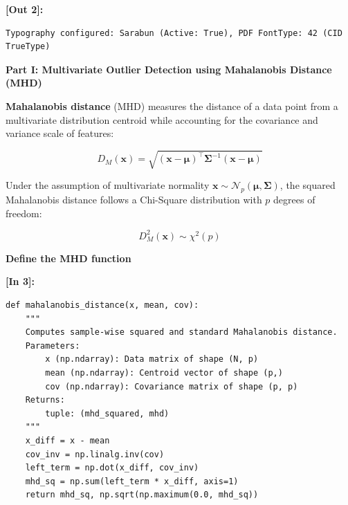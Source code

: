 \vspace{0.2em}
\noindent\textbf{\small [Out 2]:}
\begin{lstlisting}[style=output]
Typography configured: Sarabun (Active: True), PDF FontType: 42 (CID TrueType)
\end{lstlisting}
\vspace{0.8em}
\begin{tcolorbox}[colback=partorange!10!white,colframe=partorange,boxrule=1pt,arc=3pt,left=6pt,right=6pt,top=4pt,bottom=4pt,unbreakable]
{\large\bfseries Part I: Multivariate Outlier Detection using Mahalanobis Distance (MHD)\par}
\end{tcolorbox}
\vspace{0.4em}
\vspace{0.3em}
\begin{tcolorbox}[colback=codebg,colframe=codeframe,boxrule=0.6pt,arc=3pt,left=6pt,right=6pt,top=4pt,bottom=4pt,unbreakable,before upper={\sloppy\raggedright}]
\textbf{Mahalanobis distance} (MHD) measures the distance of a data point from a multivariate distribution centroid while accounting for the covariance and variance scale of features:

\[D_M(\mathbf{x}) = \sqrt{(\mathbf{x} - \boldsymbol{\mu})^\top \mathbf{\Sigma}^{-1} (\mathbf{x} - \boldsymbol{\mu})}\]

Under the assumption of multivariate normality \(\mathbf{x} \sim \mathcal{N}_p(\boldsymbol{\mu}, \mathbf{\Sigma})\), the squared Mahalanobis distance follows a Chi-Square distribution with \(p\) degrees of freedom:

\[D_M^2(\mathbf{x}) \sim \chi^2(p)\]
\end{tcolorbox}
\vspace{0.3em}
\vspace{0.3em}
\begin{tcolorbox}[colback=gray!5!white,colframe=gray!50!black,boxrule=0.5pt,arc=2pt,left=5pt,right=5pt,top=2pt,bottom=2pt,unbreakable,before upper={\sloppy\raggedright}]
{\small\bfseries Define the MHD function\par}
\end{tcolorbox}
\vspace{0.2em}
\vspace{0.4em}
\noindent\textbf{\small [In 3]:}
\begin{lstlisting}[style=pycode]
def mahalanobis_distance(x, mean, cov):
    """
    Computes sample-wise squared and standard Mahalanobis distance.
    Parameters:
        x (np.ndarray): Data matrix of shape (N, p)
        mean (np.ndarray): Centroid vector of shape (p,)
        cov (np.ndarray): Covariance matrix of shape (p, p)
    Returns:
        tuple: (mhd_squared, mhd)
    """
    x_diff = x - mean
    cov_inv = np.linalg.inv(cov)
    left_term = np.dot(x_diff, cov_inv)
    mhd_sq = np.sum(left_term * x_diff, axis=1)
    return mhd_sq, np.sqrt(np.maximum(0.0, mhd_sq))
\end{lstlisting}
